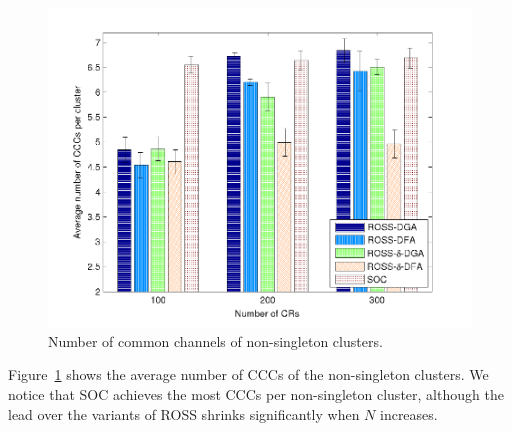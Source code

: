 \documentclass[10pt,journal,compsoc]{IEEEtran}
\theoremstyle{mytheoremstyle}
\theoremstyle{mytheoremstyle}
\theoremstyle{mytheoremstyle}
\newcommand{\ie}{i.e., }
\begin{document}
\begin{figure}[ht!]
  \centering
  \includegraphics[width=.7\linewidth]{ccc_large_scale_color.pdf}
  \caption{Number of common channels of non-singleton clusters.}
  \label{ccc_large_scale}
\end{figure}

Figure~\ref{ccc_large_scale} shows the average number of CCCs of the non-singleton clusters.
We notice that SOC achieves the most CCCs per non-singleton cluster, although the lead over the variants of ROSS shrinks significantly when $N$ increases.
\end{document}
